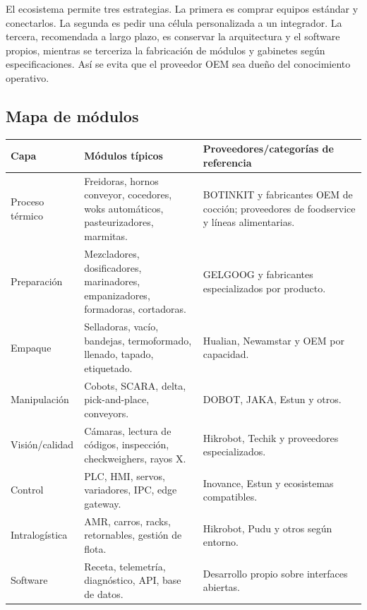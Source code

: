 \documentclass[11pt,a4paper]{article}
\begin{document}
El ecosistema permite tres estrategias. La primera es comprar equipos estándar y conectarlos. La segunda
es pedir una célula personalizada a un integrador. La tercera, recomendada a largo plazo, es conservar la
arquitectura y el software propios, mientras se terceriza la fabricación de módulos y gabinetes según
especificaciones. Así se evita que el proveedor OEM sea dueño del conocimiento operativo.

\subsection{Mapa de módulos}
{\small
\begin{xltabular}{\textwidth}{@{}P{2.8cm}LL@{}}
\toprule
\textbf{Capa} & \textbf{Módulos típicos} & \textbf{Proveedores/categorías de referencia}\\ \midrule
\endhead
Proceso térmico & Freidoras, hornos conveyor, cocedores, woks automáticos, pasteurizadores, marmitas. & BOTINKIT y fabricantes OEM de cocción; proveedores de foodservice y líneas alimentarias.\\
Preparación & Mezcladores, dosificadores, marinadores, empanizadores, formadoras, cortadoras. & GELGOOG y fabricantes especializados por producto.\\
Empaque & Selladoras, vacío, bandejas, termoformado, llenado, tapado, etiquetado. & Hualian, Newamstar y OEM por capacidad.\\
Manipulación & Cobots, SCARA, delta, pick-and-place, conveyors. & DOBOT, JAKA, Estun y otros.\\
Visión/calidad & Cámaras, lectura de códigos, inspección, checkweighers, rayos X. & Hikrobot, Techik y proveedores especializados.\\
Control & PLC, HMI, servos, variadores, IPC, edge gateway. & Inovance, Estun y ecosistemas compatibles.\\
Intralogística & AMR, carros, racks, retornables, gestión de flota. & Hikrobot, Pudu y otros según entorno.\\
Software & Receta, telemetría, diagnóstico, API, base de datos. & Desarrollo propio sobre interfaces abiertas.\\
\bottomrule
\end{xltabular}}
\end{document}

